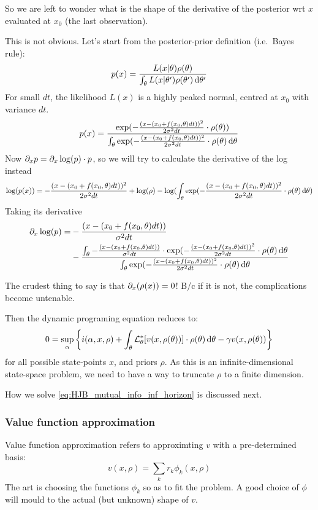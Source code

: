 \documentclass{article}
\begin{document}
So we are left to wonder what is the shape of the derivative of the posterior
wrt $x$ evaluated at $x_0$ (the last observation).

This is not obvious. Let's start from the posterior-prior definition (i.e.\
Bayes rule):
$$
p(x) = \frac{L(x|{\theta}) \rho({\theta})}{ \int_{\theta} L(x|{\theta}') \rho({\theta}') \, \mathrm{d} {\theta}'} 
$$
For small $dt$, the likelihood $L(x)$ is a highly peaked normal, centred at
$x_0$ with variance $dt$. 
$$
p(x) = 
\frac{\exp(-\frac{(x- (x_0 + f(x_0, {\theta}) dt))^2}{2{\sigma }^2 dt}\cdot
\rho({\theta}))}
{\int_{\theta} \exp(-\frac{(x- (x_0 + f(x_0, {\theta}) dt))^2}{2{\sigma }^2 dt}\cdot
\rho({\theta}) \, \mathrm{d} {\theta} } $$
Now ${\partial}_x p = {\partial}_x \log(p) \cdot p$, so we will try to calculate the
derivative of the log instead
$$
\log(p(x)) = -\frac{(x- (x_0 + f(x_0, {\theta}) dt))^2}{2{\sigma }^2 dt} +
\log(\rho) -
\log({\int_{\theta} \exp(-\frac{(x- (x_0 + f(x_0, {\theta}) dt))^2}{2{\sigma }^2 dt}\cdot
\rho({\theta}) \, \mathrm{d} {\theta} } )
$$
Taking its derivative
\begin{align*}
{\partial}_x \log(p) =& -\frac{(x- (x_0 + f(x_0, {\theta}) dt))}{{\sigma }^2 dt}
\\ 
&- \frac{\int_{\theta} -\frac{(x- (x_0 + f(x_0, {\theta}) dt))}{{\sigma }^2 dt} \cdot \exp(-\frac{(x- (x_0 + f(x_0, {\theta})
dt))^2}{2{\sigma }^2 dt}\cdot \rho({\theta}) \, \mathrm{d} {\theta} }
{\int_{\theta} \exp(-\frac{(x- (x_0 + f(x_0, {\theta}) dt))^2}{2{\sigma }^2 dt}\cdot
\rho({\theta}) \, \mathrm{d} {\theta} }
\end{align*}



The crudest thing to say is that $ {\partial}_x (\rho(x))= 0$! B/c if it is not, the
complications become untenable. 

Then the dynamic programing equation reduces to: 
\begin{equation}
0 = \sup_{\alpha} \left\{ i({\alpha}, x, \rho) +
\int_{\theta} { \mathcal{L} }_{\theta}^*[v(x, \rho({\theta}))]\cdot \rho({\theta})\, \mathrm{d} {\theta} - {\gamma } v(x,
\rho({\theta}))\right\}
\label{eq:HJB_mutual_info_inf_horizon}
\end{equation}
for all possible state-points $x$, and priors $\rho$.
As this is an infinite-dimensional state-space problem, we need to have a way to
truncate $\rho$ to a finite dimension.

How we solve \cref{eq:HJB_mutual_info_inf_horizon} is discussed next.


\subsubsection{Value function approximation}
Value function approximation refers to approximting $v$ with a pre-determined
basis:
$$
v(x,\rho) = \sum_k r_k \phi_k (x, \rho)
$$
The art is choosing the functions $\phi_k$ so as to fit the problem. A good
choice of $\phi$ will mould to the actual (but unknown) shape of $v$.
\end{document}
